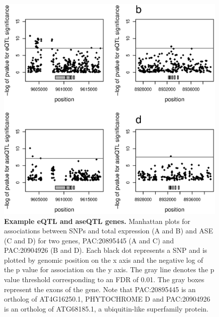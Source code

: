 \begin{figure}[ht]
      \centering
       \includegraphics[width=\linewidth]{Ch3Examples}
    \caption{\textbf{Example eQTL and aseQTL genes.} Manhattan plots for associations between SNPs and total expression (A and B) and ASE (C and D) for two genes, PAC:20895445 (A and C) and PAC:20904926 (B and D). Each black dot represents a SNP and is plotted by genomic position on the x axis and the negative log of the p value for association on the y axis. The gray line denotes the p value threshold corresponding to an FDR of 0.01. The gray boxes represent the exons of the gene. Note that PAC:20895445 is an ortholog of AT4G16250.1, PHYTOCHROME D and PAC:20904926 is an ortholog of ATG68185.1, a ubiquitin-like superfamily protein.}
    \label{fig:3figS3}
\end{figure}


